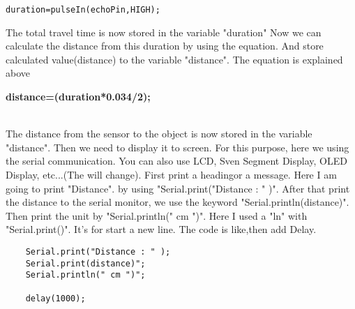 \lstset{language=Python}
\lstset{frame=lines}
\lstset{basicstyle=\footnotesize}
\begin{lstlisting}
duration=pulseIn(echoPin,HIGH);
\end{lstlisting}
    The total travel time is now stored in the variable "duration"
    Now we can calculate the distance from this duration by using the equation. And store calculated value(distance) to the variable "distance". The equation is explained above\\
\begin{center}
    \textbf{distance=(duration*0.034/2);}
\end{center}\\
The distance from the sensor to the object is now stored in the variable "distance".
Then we need to display it to screen. For this purpose, here we using the serial communication. You can also use LCD, Sven Segment Display, OLED Display, etc...(The will change). First print a headingor a message. Here I am going to print "Distance". by using "Serial.print("Distance : " )". After that print the distance to the serial monitor, we use the keyword "Serial.println(distance)". Then print the unit by "Serial.println(" cm ")". Here I used a "ln" with "Serial.print()". It's for start a new line. The code is like,then add Delay.
\lstset{language=Python}
\lstset{frame=lines}
\lstset{basicstyle=\footnotesize}
\begin{lstlisting}
    Serial.print("Distance : " );
    Serial.print(distance)";
    Serial.println(" cm ")";
	
	delay(1000);

\end{lstlisting}
\vspace{10pt}
